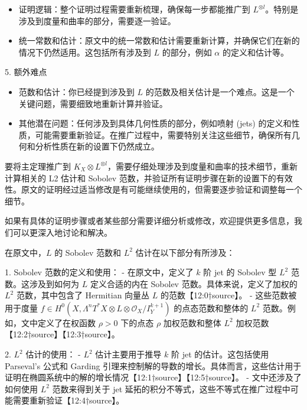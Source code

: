\documentclass[lang=cn,12pt,fontset=none,a4paper]{beautybook}
\begin{document}
\begin{itemize}
   \item 证明逻辑：整个证明过程需要重新梳理，确保每一步都能推广到 $L^{\otimes l}$。特别是涉及到度量和曲率的部分，需要逐一验证。
         
   \item 统一常数和估计：原文中的统一常数和估计需要重新计算，并确保它们在新的情况下仍然适用。这包括所有涉及到 $L$ 的部分，例如 $\alpha$ 的定义和估计等。
\end{itemize}


5. 额外难点
\begin{itemize}
   \item 范数和估计：你已经提到涉及到 $L$ 的范数及相关估计是一个难点。这是一个关键问题，需要细致地重新计算并验证。
         
   \item 其他潜在问题：任何涉及到具体几何性质的部分，例如喷射 (jets) 的定义和性质，可能需要重新验证。在推广过程中，需要特别关注这些细节，确保所有几何和分析性质在新的设置下仍然成立。
\end{itemize}



要将主定理推广到 $K_X \otimes L^{\otimes l}$，需要仔细处理涉及到度量和曲率的技术细节，重新计算相关的 L2 估计和 Sobolev 范数，并验证所有证明步骤在新的设置下的有效性。原文的证明经过适当修改是有可能继续使用的，但需要逐步验证和调整每一个细节。

如果有具体的证明步骤或者某些部分需要详细分析或修改，欢迎提供更多信息，我们可以更深入地讨论和解决。


在原文中，$L$ 的 Sobolev 范数和 $L^2$ 估计在以下部分有所涉及：

1. Sobolev 范数的定义和使用：
- 在原文中，定义了 $k$ 阶 jet 的 Sobolev 型 $L^2$ 范数。这涉及到如何为 $L$ 定义合适的内在 Sobolev 范数。具体来说，定义了加权的 $L^2$ 范数，其中包含了 Hermitian 向量丛 $L$ 的范数【12:0†source】。
- 这些范数被用于度量 $f \in H^0(X, \Lambda^n T^*X \otimes L \otimes \mathcal{O}_X / I^{k+1}_Y)$ 的点态范数和整体的 $L^2$ 范数。例如，文中定义了在权函数 $\rho > 0$ 下的点态 $\rho$ 加权范数和整体 $L^2$ 加权范数【12:2†source】【12:3†source】。

2. $L^2$ 估计的使用：
- $L^2$ 估计主要用于推导 $k$ 阶 jet 的估计。这包括使用 Parseval's 公式和 Garding 引理来控制解的导数的增长。具体而言，这些估计用于证明在椭圆系统中的解的增长情况【12:1†source】【12:5†source】。
- 文中还涉及了如何使用 $L^2$ 范数来得到关于 jet 延拓的积分不等式，这些不等式在推广过程中可能需要重新验证【12:4†source】。
\end{document}
